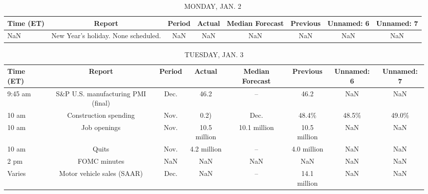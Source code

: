 \documentclass{article}%
\begin{document}
%
\normalsize%


\begin{table}[htbp]%
\caption{MONDAY, JAN. 2}%
\centering%
\begin{adjustbox}{width=1\textwidth}%
\begin{tabular}{lccccccc}
\toprule
Time (ET) &                              Report & Period & Actual & Median Forecast & Previous & Unnamed: 6 & Unnamed: 7 \\
\midrule
      NaN & New Year's holiday. None scheduled. &    NaN &    NaN &             NaN &      NaN &        NaN &        NaN \\
\bottomrule
\end{tabular}
%
\end{adjustbox}%
\end{table}

%


\begin{table}[htbp]%
\caption{TUESDAY, JAN. 3}%
\centering%
\begin{adjustbox}{width=1\textwidth}%
\begin{tabular}{lccccccc}
\toprule
Time (ET) &                             Report & Period &       Actual & Median Forecast &     Previous & Unnamed: 6 & Unnamed: 7 \\
\midrule
  9:45 am & S\&P U.S. manufacturing PMI (final) &   Dec. &         46.2 &              -- &         46.2 &        NaN &        NaN \\
    10 am &              Construction spending &   Nov. &         0.2) &            Dec. &        48.4\% &      48.5\% &      49.0\% \\
    10 am &                       Job openings &   Nov. & 10.5 million &    10.1 million & 10.5 million &        NaN &        NaN \\
    10 am &                              Quits &   Nov. &  4.2 million &              -- &  4.0 million &        NaN &        NaN \\
     2 pm &                       FOMC minutes &    NaN &          NaN &             NaN &          NaN &        NaN &        NaN \\
   Varies &         Motor vehicle sales (SAAR) &   Dec. &          NaN &              -- & 14.1 million &        NaN &        NaN \\
\bottomrule
\end{tabular}
%
\end{adjustbox}%
\end{table}
\end{document}
